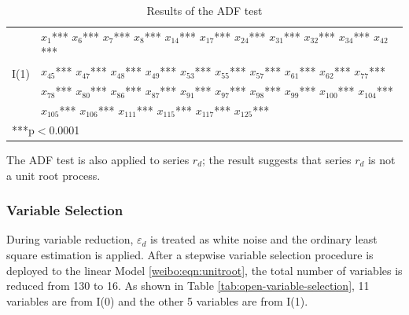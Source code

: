 \documentclass[review,3p,times,12pt,number]{elsarticle}
\begin{document}
\begin{table}[htbp]
\caption{Results of the ADF test}
\label{tab:adf-test}
\center
\begin{tabular} {l l}
\hline
\multirow{4}{*}{I(1)}
&  $x_1$*** $x_6$*** $x_7$*** $x_8$*** $x_{14}$*** $x_{17}$*** $x_{24}$*** $x_{31}$*** $x_{32}$*** $x_{34}$*** $x_{42}$***\\
& $x_{45}$*** $x_{47}$*** $x_{48}$*** $x_{49}$*** $x_{53}$*** $x_{55}$*** $x_{57}$*** $x_{61}$*** $x_{62}$*** $x_{77}$***\\
& $x_{78}$*** $x_{80}$*** $x_{86}$*** $x_{87}$*** $x_{91}$*** $x_{97}$*** $x_{98}$*** $x_{99}$*** $x_{100}$*** $x_{104}$***\\
& $x_{105}$*** $x_{106}$*** $x_{111}$*** $x_{115}$*** $x_{117}$*** $x_{125}$*** \\
\hline
\multicolumn{2}{l}{***p$<$0.0001}
\end{tabular}
\end{table}

The ADF test is also applied to series $r_d$; the result suggests that series $r_d$ is not a unit root process.

\subsubsection{Variable Selection}

During variable reduction, $\varepsilon_d$ is treated as white noise and the ordinary least square estimation is applied. After a stepwise variable selection procedure is deployed to the linear Model \ref{weibo:eqn:unitroot}, the total number of variables is reduced from 130 to 16. As shown in Table \ref{tab:open-variable-selection}, 11 variables are from I(0) and the other 5 variables are from I(1).
\end{document}
